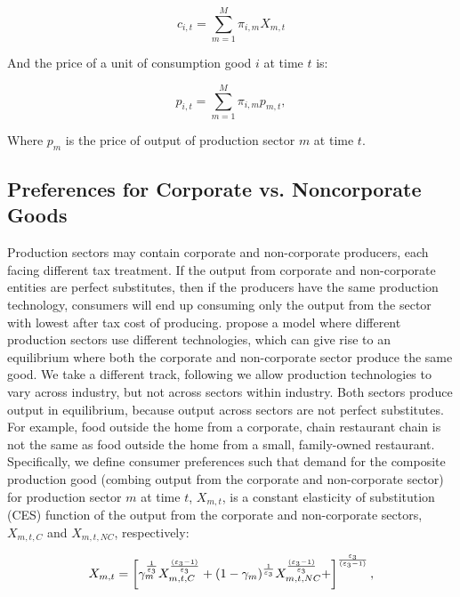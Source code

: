              \begin{equation} \label{eqn:mix_cons}
             c_{i,t} = \sum_{m=1}^{M}\pi_{i,m}X_{m,t} 
    	\end{equation}
	
 \noindent\noindent And the price of a unit of consumption good $i$ at time $t$ is:
	
             \begin{equation} \label{eqn:mix_cons_price}
             p_{i,t} = \sum_{m=1}^{M}\pi_{i,m}p_{m,t}, 
    	\end{equation}
    
    \noindent\noindent Where $p_{m}$ is the price of output of production sector $m$ at time $t$.
    
    \subsection{Preferences for Corporate vs. Noncorporate Goods}\label{sec:pref_corp_noncorp}
    
    Production sectors may contain corporate and non-corporate producers, each facing different tax treatment.  If the output from corporate and non-corporate entities are perfect substitutes, then if the producers have the same production technology, consumers will end up consuming only the output from the sector with lowest after tax cost of producing.  \citet{GK1989} propose a model where different production sectors use different technologies, which can give rise to an equilibrium where both the corporate and non-corporate sector produce the same good.  We take a different track, following \citet{FR1993} we allow production technologies to vary across industry, but not across sectors within industry.  Both sectors produce output in equilibrium, because output across sectors are not perfect substitutes.  For example, food outside the home from a corporate, chain restaurant chain is not the same as food outside the home from a small, family-owned restaurant.  Specifically, we define consumer preferences such that demand for the composite production good (combing output from the corporate and non-corporate sector) for production sector $m$ at time $t$, $X_{m,t}$, is a constant elasticity of substitution (CES) function of the output from the corporate and non-corporate sectors, $X_{m,t,C}$ and $X_{m,t,NC}$, respectively:
    
                  \begin{equation} \label{eqn:comp_output}
             X_{m,t} = \left[\gamma_{m}^{\frac{1}{\varepsilon_{3}}}X_{m,t,C}^{\frac{(\varepsilon_{3}-1)}{\varepsilon_{3}}}+(1-\gamma_{m})^{\frac{1}{\varepsilon_{3}}}X_{m,t,NC}^{\frac{(\varepsilon_{3}-1)}{\varepsilon_{3}}}+\right]^{\frac{\varepsilon_{3}}{(\varepsilon_{3}-1)}}, 
    	\end{equation}
	
